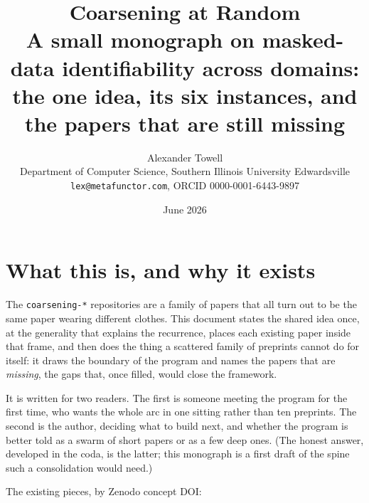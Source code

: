 \documentclass[11pt]{article}
\title{Coarsening at Random \\[6pt]
  {\large\normalfont A small monograph on masked-data identifiability across
  domains: the one idea, its six instances, and the papers that are still
  missing}}
\author{Alexander Towell \\
  Department of Computer Science, Southern Illinois University Edwardsville \\
  \texttt{lex@metafunctor.com}, ORCID 0000-0001-6443-9897}
\date{June 2026}
\begin{document}
\maketitle
\tableofcontents
\bigskip

\section{What this is, and why it exists}

The \texttt{coarsening-*} repositories are a family of papers that all turn out to
be the same paper wearing different clothes. This document states the shared idea
once, at the generality that explains the recurrence, places each existing paper
inside that frame, and then does the thing a scattered family of preprints cannot
do for itself: it draws the boundary of the program and names the papers that are
\emph{missing}, the gaps that, once filled, would close the framework.

It is written for two readers. The first is someone meeting the program for the
first time, who wants the whole arc in one sitting rather than ten preprints. The
second is the author, deciding what to build next, and whether the program is
better told as a swarm of short papers or as a few deep ones. (The honest answer,
developed in the coda, is the latter; this monograph is a first draft of the spine
such a consolidation would need.)

The existing pieces, by Zenodo concept DOI:
\end{document}
